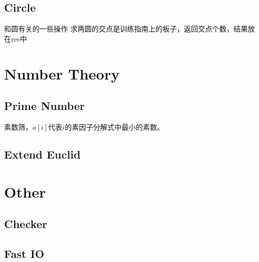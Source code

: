 \documentclass[twoside, UTF8]{article}
\begin{document}
		\subsection{Circle}
			\begin{flushleft}
				和圆有关的一些操作
				\linebreak 求两圆的交点是训练指南上的板子，返回交点个数，结果放在res中
			\end{flushleft}
			
	\newpage
	\section{Number Theory}
		\subsection{Prime Number}
			\begin{flushleft}
				素数筛，$a[i]$代表$i$的素因子分解式中最小的素数。
			\end{flushleft}
			
		\subsection{Extend Euclid}
			
	\newpage
	\section{Other}
		\subsection{Checker}
			
		\subsection{Fast IO}
			
\end{document}
